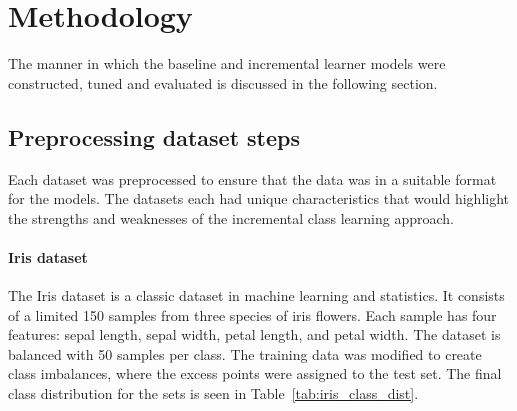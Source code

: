 \documentclass[conference]{IEEEtran}
\begin{document}
\section{Methodology}
The manner in which the baseline and incremental learner models were constructed, tuned and evaluated is discussed in the following section. 

\subsection{Preprocessing dataset steps}
Each dataset was preprocessed to ensure that the data was in a suitable format for the models. The datasets each had unique characteristics 
that would highlight the strengths and weaknesses of the incremental class learning approach. 
\paragraph{Iris dataset}
The Iris dataset \cite{fisher1936iris} is a classic dataset in machine learning and statistics. It consists of a limited 150 samples from 
three species of iris flowers. Each sample has four features: sepal length, sepal width, petal length, and petal width. The dataset is balanced with 50 samples per class. 
 The training data was modified to create class imbalances, where the excess points were assigned to the test set. The final class 
distribution for the sets is seen in Table~\ref{tab:iris_class_dist}.
\begin{table}[H]
  \centering
  \caption{Class distribution of the modified Iris dataset}
  \label{tab:iris_class_dist}
\end{table}
\end{document}
